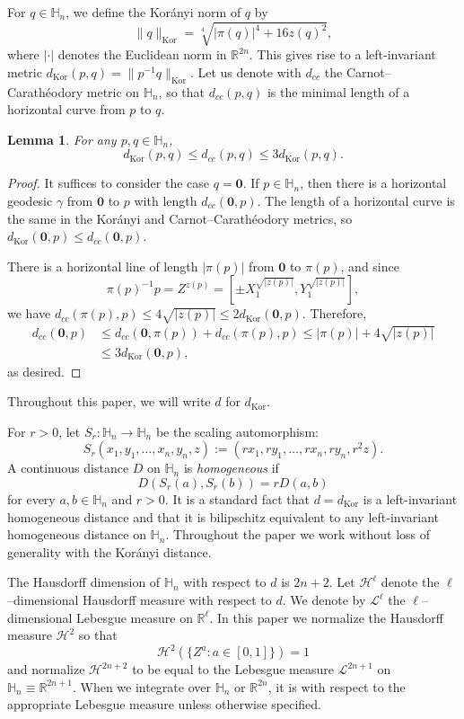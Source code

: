 \documentclass[12pt,reqno]{amsart}
\newcommand{\cL}{\mathcal{L}}
\newcommand{\dcc}{d_{cc}}
\newcommand{\HH}{\mathbb{H}}
\newcommand{\R}{\mathbb{R}}
\newcommand{\zero}{\mathbf{0}}
\newcommand{\from}{\colon}
\newtheorem{lemma}[thm]{Lemma}
\theoremstyle{remark}
\newcommand{\0}{\mathbf{0}}
\renewcommand{\1}{\mathbf 1}
\DeclareMathOperator{\Kor}{Kor}
\begin{document}
For $q\in \HH_n$, we define the Korányi norm of $q$ by
\begin{equation}\label{eq:def-kor}
  \|q\|_{\Kor} = \sqrt[4]{|\pi(q)|^4 + 16 z(q)^2},
\end{equation}
where $|\cdot|$ denotes the Euclidean norm in $\R^{2n}$.
This gives rise to a left-invariant metric $d_{\Kor}(p,q) = \|p^{-1}q\|_{\Kor}$. Let us denote with $\dcc$ the Carnot--Carath\'eodory metric on $\HH_n$, so that $\dcc(p,q)$ is the minimal length of a horizontal curve from $p$ to $q$.
\begin{lemma}\label{lem:cc-kor}
  For any $p, q \in \HH_n$,
  $$d_{\Kor}(p,q)\le \dcc(p,q) \le 3 d_{\Kor}(p,q).$$
\end{lemma}
\begin{proof}
  It suffices to consider the case $q=\zero$. If $p\in \HH_n$, then there is a horizontal geodesic $\gamma$ from $\zero$ to $p$ with length $\dcc(\zero,p)$. The length of a horizontal curve is the same in the Korányi and Carnot--Carathéodory metrics, so $d_{\Kor}(\zero,p)\le \dcc(\zero,p)$.

  There is a horizontal line of length $|\pi(p)|$ from $\zero$ to $\pi(p)$, and since
  $$\pi(p)^{-1} p = Z^{z(p)} = \left[\pm X_1^{\sqrt{|z(p)|}}, Y_1^{\sqrt{|z(p)|}}\right],$$ we have $\dcc(\pi(p), p)\le 4\sqrt{|z(p)|} \le 2 d_{\Kor}(\zero,p)$. Therefore,
  \[
  \begin{aligned}
  \dcc(\zero,p) &\le \dcc(\zero, \pi(p)) + \dcc(\pi(p), p) \le |\pi(p)| + 4\sqrt{|z(p)|} \\
  &\le 3 d_{\Kor}(\zero,p),
  \end{aligned}
  \]
  as desired.
\end{proof}

Throughout this paper, we will write $d$ for $d_{\Kor}$. 

For $r>0$, let $S_r\from \HH_n\to \HH_n$ be the scaling automorphism:
\[
S_r(x_1,y_1,\ldots,x_n,y_n,z):=(rx_1,ry_1,\ldots,rx_n,ry_n,r^2z).
\]
A continuous distance $D$ on $\HH_n$ is \emph{homogeneous} if $$D(S_r(a),S_r(b))=rD(a,b)$$ for every $a,b\in \HH_n$ and $r>0$. It is a standard fact that $d=d_{\Kor}$ is a left-invariant homogeneous distance and that it is bilipschitz equivalent to any left-invariant homogeneous distance on $\HH_n$. Throughout the paper we work without loss of generality with the Kor\'anyi distance.

The Hausdorff dimension of $\HH_n$ with respect to $d$ is $2n+2$. Let $\mathcal{H}^\ell$ denote the $\ell$--dimensional Hausdorff measure with respect to $d$. We denote by $\mathcal{L}^\ell$ the $\ell$--dimensional Lebesgue measure on $\mathbb R^\ell$. In this paper we normalize the Hausdorff measure $\mathcal{H}^2$ so that 
\begin{equation}\label{eq:h2-normalize}
  \mathcal{H}^2(\{Z^a : a\in [0,1]\})=1
\end{equation}
and normalize $\mathcal{H}^{2n+2}$ to be equal to the Lebesgue measure $\cL^{2n+1}$ on $\HH_n\equiv \mathbb R^{2n+1}$. When we integrate over $\HH_n$ or $\R^{2n}$, it is with respect to the appropriate Lebesgue measure unless otherwise specified.
\end{document}

